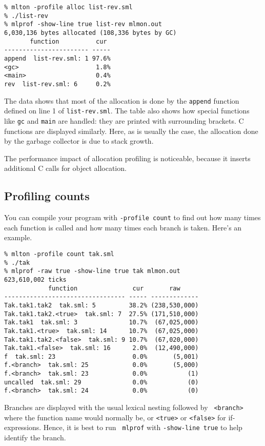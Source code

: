 \begin{verbatim}
% mlton -profile alloc list-rev.sml
% ./list-rev
% mlprof -show-line true list-rev mlmon.out
6,030,136 bytes allocated (108,336 bytes by GC)
       function          cur 
----------------------- -----
append  list-rev.sml: 1 97.6%
<gc>                     1.8%
<main>                   0.4%
rev  list-rev.sml: 6     0.2%
\end{verbatim}
%
The data shows that most of the allocation is done by the {\tt append}
function defined on line 1 of {\tt list-rev.sml}.  The table also
shows how special functions like {\tt gc} and {\tt main} are handled:
they are printed with surrounding brackets.  C functions are displayed
similarly.  Here, as is usually the case, the allocation done by the
garbage collector is due to stack growth.

The performance impact of allocation profiling is noticeable, because
it inserts additional C calls for object allocation.
%
\subsection{Profiling counts}

You can compile your program with {\tt -profile count} to find out how
many times each function is called and how many times each branch is
taken.  Here's an example.

\begin{verbatim}
% mlton -profile count tak.sml
% ./tak
% mlprof -raw true -show-line true tak mlmon.out
623,610,002 ticks
            function               cur       raw     
--------------------------------- ----- -------------
Tak.tak1.tak2  tak.sml: 5         38.2% (238,530,000)
Tak.tak1.tak2.<true>  tak.sml: 7  27.5% (171,510,000)
Tak.tak1  tak.sml: 3              10.7%  (67,025,000)
Tak.tak1.<true>  tak.sml: 14      10.7%  (67,025,000)
Tak.tak1.tak2.<false>  tak.sml: 9 10.7%  (67,020,000)
Tak.tak1.<false>  tak.sml: 16      2.0%  (12,490,000)
f  tak.sml: 23                     0.0%       (5,001)
f.<branch>  tak.sml: 25            0.0%       (5,000)
f.<branch>  tak.sml: 23            0.0%           (1)
uncalled  tak.sml: 29              0.0%           (0)
f.<branch>  tak.sml: 24            0.0%           (0)
\end{verbatim}

Branches are displayed with the usual lexical nesting followed by {\tt
<branch>} where the function name would normally be, or {\tt <true>}
or {\tt <false>} for if-expressions.  Hence, it is best to run {\tt
mlprof} with {\tt -show-line true} to help identify the branch.

